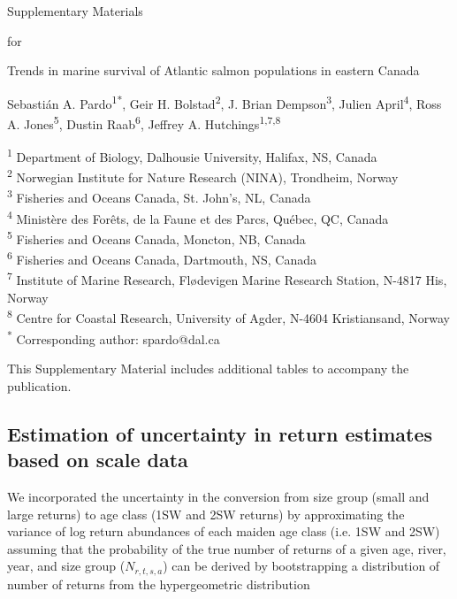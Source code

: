 \documentclass[12pt]{article}
\newcommand{\beginsupplement}{%
        \setcounter{table}{0}
        \renewcommand{\thetable}{S\arabic{table}}%
        \setcounter{figure}{0}
        \renewcommand{\thefigure}{S\arabic{figure}}%
     }
\begin{document}
\linenumbers


\noindent
{\Large Supplementary Materials}
\newline

\noindent
{\Large for}
\newline

\noindent
{\large Trends in marine survival of Atlantic salmon populations in eastern Canada}
\newline

\noindent
Sebasti\'{a}n A. Pardo\textsuperscript{1*}, Geir H. Bolstad\textsuperscript{2}, J. Brian Dempson\textsuperscript{3},
        Julien April\textsuperscript{4}, Ross A. Jones\textsuperscript{5}, %
        Dustin Raab\textsuperscript{6}, Jeffrey A. Hutchings\textsuperscript{1,7,8}
\newline

\noindent
\small{\textsuperscript{1} Department of Biology, Dalhousie University, Halifax, NS, Canada\\}
\small{\textsuperscript{2} Norwegian Institute for Nature Research (NINA), Trondheim, Norway\\}
\small{\textsuperscript{3} Fisheries and Oceans Canada, St. John's, NL, Canada\\}
\small{\textsuperscript{4} Minist\`{e}re des For\^{e}ts, de la Faune et des Parcs, Qu\'{e}bec, QC, Canada\\}
\small{\textsuperscript{5} Fisheries and Oceans Canada, Moncton, NB, Canada\\}
\small{\textsuperscript{6} Fisheries and Oceans Canada, Dartmouth, NS, Canada\\}
\small{\textsuperscript{7} Institute of Marine Research, Flødevigen Marine Research Station, N-4817 His, Norway\\}
\small{\textsuperscript{8} Centre for Coastal Research, University of Agder, N-4604 Kristiansand, Norway\\}
\small{\textsuperscript{*} Corresponding author: spardo@dal.ca}
\beginsupplement

This Supplementary Material includes additional tables to accompany the publication.

\clearpage

\subsection*{Estimation of uncertainty in return estimates based on scale data}

We incorporated the uncertainty in the conversion from size group (small and large returns) to age class (1SW and 2SW returns) by
approximating the variance of log return abundances of each maiden age class (i.e. 1SW and 2SW) assuming that the probability
of the true number of returns of a given age, river, year, and size group ($N_{r,t,s,a}$) can be derived by bootstrapping a distribution
of number of returns from the hypergeometric distribution
\end{document}
